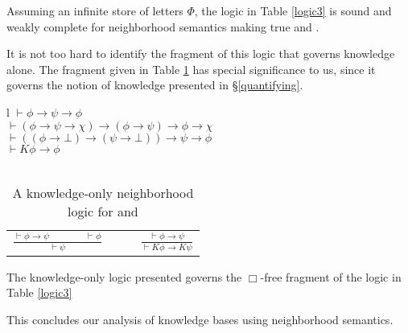 \begin{theorem}
  Assuming an infinite store of letters $\Phi$, the logic in Table
  \ref{logic3} is sound and weakly complete for neighborhood semantics making
  true  and .
\end{theorem}



It is not too hard to identify the fragment of this logic that governs
knowledge alone.  The fragment given in Table \ref{logic4} has special
significance to us, since it governs the notion of knowledge presented in
{\S}\ref{quantifying}.

\begin{table}[h]
  \begin{tabular}{l}
    $\vdash \phi \rightarrow \psi \rightarrow \phi$\\
    $\vdash (\phi \rightarrow \psi \rightarrow \chi) \rightarrow (\phi
    \rightarrow \psi) \rightarrow \phi \rightarrow \chi$\\
    $\vdash ((\phi \rightarrow \bot) \rightarrow (\psi \rightarrow \bot))
    \rightarrow \psi \rightarrow \phi$\\
    $\vdash K \phi \rightarrow \phi$\\
    \\
    \begin{tabular}{llll}
      $\frac{\vdash \phi \rightarrow \psi \hspace{4em} \vdash \phi}{\vdash
      \psi}$ &  &  & $\frac{\vdash \phi \rightarrow \psi}{\vdash K \phi
      \rightarrow K \psi}$
    \end{tabular}
  \end{tabular}
  \caption{\label{logic4}A knowledge-only neighborhood logic for
   and {}}
\end{table}

\begin{proposition}
  The knowledge-only logic presented governs the $\Box$-free fragment of the
  logic in Table \ref{logic3}
\end{proposition}

This concludes our analysis of knowledge bases using neighborhood
semantics.

